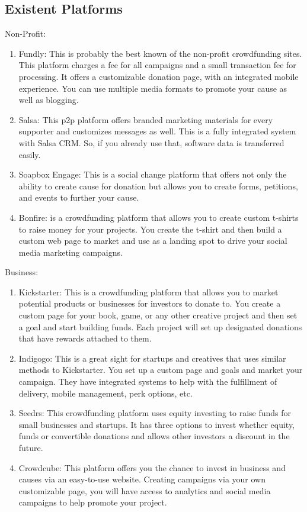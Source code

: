 \subsection*{ Existent Platforms }
Non-Profit:
\begin{enumerate}
      \item
            Fundly: This is probably the best known of the non-profit crowdfunding sites. This platform charges a fee for all campaigns and a small transaction fee for processing. It offers a customizable donation page, with an integrated mobile experience. You can use multiple media formats to promote your cause as well as blogging.
      \item
            Salsa: This p2p platform offers branded marketing materials for every supporter and customizes messages as well. This is a fully integrated system with Salsa CRM. So, if you already use that, software data is transferred easily.
      \item
            Soapbox Engage: This is a social change platform that offers not only the ability to create cause for donation but allows you to create forms, petitions, and events to further your cause.
      \item
            Bonfire: is a crowdfunding platform that allows you to create custom t-shirts to raise money for your projects. You create the t-shirt and then build a custom web page to market and use as a landing spot to drive your social media marketing campaigns.
\end{enumerate}
Business:
\begin{enumerate}
      \item
            Kickstarter: This is a crowdfunding platform that allows you to market potential products or businesses for investors to donate to. You create a custom page for your book, game, or any other creative project and then set a goal and start building funds. Each project will set up designated donations that have rewards attached to them.
      \item
            Indigogo: This is a great sight for startups and creatives that uses similar methods to Kickstarter. You set up a custom page and goals and market your campaign. They have integrated systems to help with the fulfillment of delivery, mobile management, perk options, etc.
      \item
            Seedrs: This crowdfunding platform uses equity investing to raise funds for small businesses and startups. It has three options to invest whether equity, funds or convertible donations and allows other investors a discount in the future.
      \item
            Crowdcube: This platform offers you the chance to invest in business and causes via an easy-to-use website. Creating campaigns via your own customizable page, you will have access to analytics and social media campaigns to help promote your project.
\end{enumerate}




